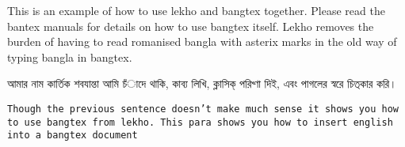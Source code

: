 \documentclass[12pt]{barticle}
\begin{document}
This is an example of how to use lekho and bangtex together. Please read the bantex manuals for details on how to use bangtex itself. Lekho removes the burden of having to read romanised bangla with asterix marks in the old way of typing bangla in bangtex.
 
\bng
আমার নাম {\LBng কার্তিক শবযান্তা} আমি চঁাদে থাকি, কাব্য  লিখি, ক্লাসিক্‌ পরিখ্ণা দিই, এবং পাগলের স্বরে চিত্‌কার করি। 

{\tt Though the previous sentence doesn't make much sense it shows you how to use bangtex from lekho. This para shows you how to insert english into a bangtex document}
\end{document}
